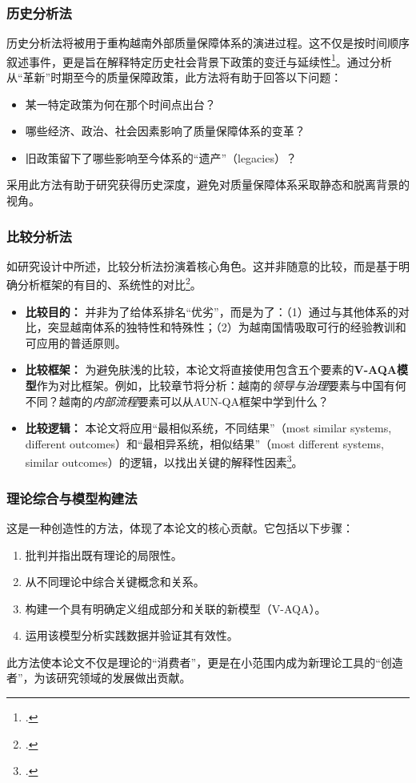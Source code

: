 \subsubsection{历史分析法}
\label{subsubsec:phan_tich_lich_su}
历史分析法将被用于重构越南外部质量保障体系的演进过程。这不仅是按时间顺序叙述事件，更是旨在解释特定历史社会背景下政策的变迁与延续性\footcite{Tosh2015}。通过分析从“革新”时期至今的质量保障政策，此方法将有助于回答以下问题：
\begin{itemize}
    \item 某一特定政策为何在那个时间点出台？
    \item 哪些经济、政治、社会因素影响了质量保障体系的变革？
    \item 旧政策留下了哪些影响至今体系的“遗产”（legacies）？
\end{itemize}
采用此方法有助于研究获得历史深度，避免对质量保障体系采取静态和脱离背景的视角。

\subsubsection{比较分析法}
\label{subsubsec:phan_tich_so_sanh}
如研究设计中所述，比较分析法扮演着核心角色。这并非随意的比较，而是基于明确分析框架的有目的、系统性的对比\footcite{Sartori1991}。
\begin{itemize}
    \item \textbf{比较目的：} 并非为了给体系排名“优劣”，而是为了：（1）通过与其他体系的对比，突显越南体系的独特性和特殊性；（2）为越南国情吸取可行的经验教训和可应用的普适原则。
    \item \textbf{比较框架：} 为避免肤浅的比较，本论文将直接使用包含五个要素的\textbf{V-AQA模型}作为对比框架。例如，比较章节将分析：越南的\textit{领导与治理}要素与中国有何不同？越南的\textit{内部流程}要素可以从AUN-QA框架中学到什么？
    \item \textbf{比较逻辑：} 本论文将应用“最相似系统，不同结果”（most similar systems, different outcomes）和“最相异系统，相似结果”（most different systems, similar outcomes）的逻辑，以找出关键的解释性因素\footcite{PrzeworskiTeune1970}。
\end{itemize}

\subsubsection{理论综合与模型构建法}
\label{subsubsec:xay_dung_mo_hinh}
这是一种创造性的方法，体现了本论文的核心贡献。它包括以下步骤：
\begin{enumerate}
    \item 批判并指出既有理论的局限性。
    \item 从不同理论中综合关键概念和关系。
    \item 构建一个具有明确定义组成部分和关联的新模型（V-AQA）。
    \item 运用该模型分析实践数据并验证其有效性。
\end{enumerate}
此方法使本论文不仅是理论的“消费者”，更是在小范围内成为新理论工具的“创造者”，为该研究领域的发展做出贡献。

